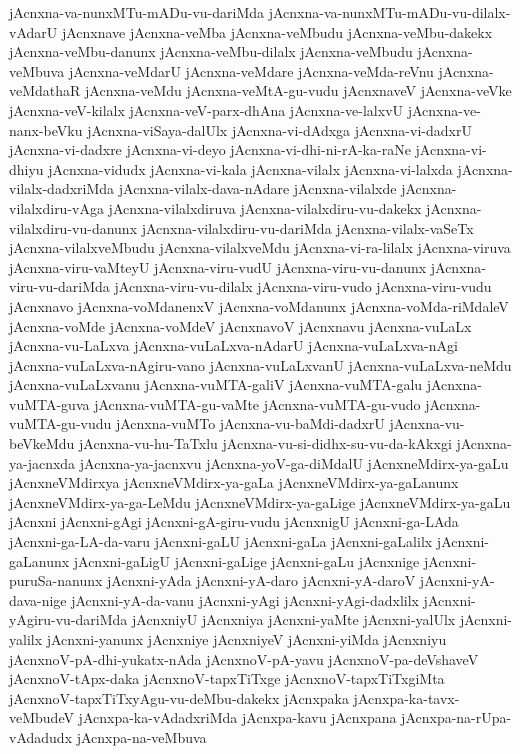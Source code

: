 {jAcnxna-va-nunxMTu-mADu-vu-dariMda
jAcnxna-va-nunxMTu-mADu-vu-dilalx-vAdarU
jAcnxnave
jAcnxna-veMba
jAcnxna-veMbudu
jAcnxna-veMbu-dakekx
jAcnxna-veMbu-danunx
jAcnxna-veMbu-dilalx
jAcnxna-veMbudu
jAcnxna-veMbuva
jAcnxna-veMdarU
jAcnxna-veMdare
jAcnxna-veMda-reVnu
jAcnxna-veMdathaR
jAcnxna-veMdu
jAcnxna-veMtA-gu-vudu
jAcnxnaveV
jAcnxna-veVke
jAcnxna-veV-kilalx
jAcnxna-veV-parx-dhAna
jAcnxna-ve-lalxvU
jAcnxna-ve-nanx-beVku
jAcnxna-viSaya-dalUlx
jAcnxna-vi-dAdxga
jAcnxna-vi-dadxrU
jAcnxna-vi-dadxre
jAcnxna-vi-deyo
jAcnxna-vi-dhi-ni-rA-ka-raNe
jAcnxna-vi-dhiyu
jAcnxna-vidudx
jAcnxna-vi-kala
jAcnxna-vilalx
jAcnxna-vi-lalxda
jAcnxna-vilalx-dadxriMda
jAcnxna-vilalx-dava-nAdare
jAcnxna-vilalxde
jAcnxna-vilalxdiru-vAga
jAcnxna-vilalxdiruva
jAcnxna-vilalxdiru-vu-dakekx
jAcnxna-vilalxdiru-vu-danunx
jAcnxna-vilalxdiru-vu-dariMda
jAcnxna-vilalx-vaSeTx
jAcnxna-vilalxveMbudu
jAcnxna-vilalxveMdu
jAcnxna-vi-ra-lilalx
jAcnxna-viruva
jAcnxna-viru-vaMteyU
jAcnxna-viru-vudU
jAcnxna-viru-vu-danunx
jAcnxna-viru-vu-dariMda
jAcnxna-viru-vu-dilalx
jAcnxna-viru-vudo
jAcnxna-viru-vudu
jAcnxnavo
jAcnxna-voMdanenxV
jAcnxna-voMdanunx
jAcnxna-voMda-riMdaleV
jAcnxna-voMde
jAcnxna-voMdeV
jAcnxnavoV
jAcnxnavu
jAcnxna-vuLaLx
jAcnxna-vu-LaLxva
jAcnxna-vuLaLxva-nAdarU
jAcnxna-vuLaLxva-nAgi
jAcnxna-vuLaLxva-nAgiru-vano
jAcnxna-vuLaLxvanU
jAcnxna-vuLaLxva-neMdu
jAcnxna-vuLaLxvanu
jAcnxna-vuMTA-galiV
jAcnxna-vuMTA-galu
jAcnxna-vuMTA-guva
jAcnxna-vuMTA-gu-vaMte
jAcnxna-vuMTA-gu-vudo
jAcnxna-vuMTA-gu-vudu
jAcnxna-vuMTo
jAcnxna-vu-baMdi-dadxrU
jAcnxna-vu-beVkeMdu
jAcnxna-vu-hu-TaTxlu
jAcnxna-vu-si-didhx-su-vu-da-kAkxgi
jAcnxna-ya-jacnxda
jAcnxna-ya-jacnxvu
jAcnxna-yoV-ga-diMdalU
jAcnxneMdirx-ya-gaLu
jAcnxneVMdirxya
jAcnxneVMdirx-ya-gaLa
jAcnxneVMdirx-ya-gaLanunx
jAcnxneVMdirx-ya-ga-LeMdu
jAcnxneVMdirx-ya-gaLige
jAcnxneVMdirx-ya-gaLu
jAcnxni
jAcnxni-gAgi
jAcnxni-gA-giru-vudu
jAcnxnigU
jAcnxni-ga-LAda
jAcnxni-ga-LA-da-varu
jAcnxni-gaLU
jAcnxni-gaLa
jAcnxni-gaLalilx
jAcnxni-gaLanunx
jAcnxni-gaLigU
jAcnxni-gaLige
jAcnxni-gaLu
jAcnxnige
jAcnxni-puruSa-nanunx
jAcnxni-yAda
jAcnxni-yA-daro
jAcnxni-yA-daroV
jAcnxni-yA-dava-nige
jAcnxni-yA-da-vanu
jAcnxni-yAgi
jAcnxni-yAgi-dadxlilx
jAcnxni-yAgiru-vu-dariMda
jAcnxniyU
jAcnxniya
jAcnxni-yaMte
jAcnxni-yalUlx
jAcnxni-yalilx
jAcnxni-yanunx
jAcnxniye
jAcnxniyeV
jAcnxni-yiMda
jAcnxniyu
jAcnxnoV-pA-dhi-yukatx-nAda
jAcnxnoV-pA-yavu
jAcnxnoV-pa-deVshaveV
jAcnxnoV-tApx-daka
jAcnxnoV-tapxTiTxge
jAcnxnoV-tapxTiTxgiMta
jAcnxnoV-tapxTiTxyAgu-vu-deMbu-dakekx
jAcnxpaka
jAcnxpa-ka-tavx-veMbudeV
jAcnxpa-ka-vAdadxriMda
jAcnxpa-kavu
jAcnxpana
jAcnxpa-na-rUpa-vAdadudx
jAcnxpa-na-veMbuva
}
